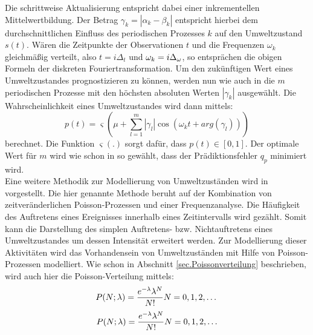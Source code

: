 Die schrittweise Aktualisierung entspricht dabei einer inkrementellen Mittelwertbildung. Der Betrag $\gamma_k = |\alpha_k - \beta_k|$ entspricht hierbei dem durchschnittlichen Einfluss des periodischen Prozesses $k$ auf den Umweltzustand $s(t)$.
Wären die Zeitpunkte der Observationen $t$ und die Frequenzen $\omega_k$ gleichmäßig verteilt, also $t=i\Delta_t$ und $\omega_k = i\Delta_{\mathrm{\omega}}$, so entsprächen die obigen Formeln der diskreten Fouriertransformation.
Um den zukünftigen Wert eines Umweltzustandes prognostizieren zu können, werden nun wie auch in \cite{Krajnik.2014} die $m$ periodischen Prozesse mit den höchsten absoluten Werten $|\gamma_k|$ ausgewählt. Die Wahrscheinlichkeit eines Umweltzustandes wird dann mittels:
\begin{equation}
	p(t) = \varsigma(\mu + \sum_{l=1}^{m} |\gamma_l|\cos(\omega_k t + arg(\gamma_l)))
	\label{eq:State_probability}
\end{equation}
berechnet. Die Funktion $\varsigma(.)$ sorgt dafür, dass $p(t) \in [0,1]$. Der optimale Wert für $m$ wird wie schon in \cite{Krajnik.2014} so gewählt, dass der Prädiktionsfehler $q_p$ minimiert wird. \\
Eine weitere Methodik zur Modellierung von Umweltzuständen wird in \cite{Jovan.2016} vorgestellt. Die hier genannte Methode beruht auf der Kombination von zeitveränderlichen Poisson-Prozessen und einer Frequenzanalyse. Die Häufigkeit des Auftretens eines Ereignisses innerhalb eines Zeitintervalls wird gezählt. Somit kann die Darstellung des simplen Auftretens- bzw. Nichtauftretens eines Umweltzustandes \cite{Krajnik.2014} um dessen \glqq Intensität\grqq{} erweitert werden. Zur Modellierung dieser Aktivitäten wird das Vorhandensein von Umweltzuständen mit Hilfe von Poisson-Prozessen modelliert. Wie schon  in Abschnitt \ref{sec.Poissonverteilung} beschrieben, wird auch hier die Poisson-Verteilung mittels:
\begin{equation}
	P(N;\lambda) = \frac{e^{\mathrm{-\lambda}} \lambda^N}{N!}	N=0,1,2,\dots
\end{equation}
\begin{align}
	P(N;\lambda) = \frac{e^{\mathrm{-\lambda}} \lambda^N}{N!}	N=0,1,2,\dots
\end{align}

